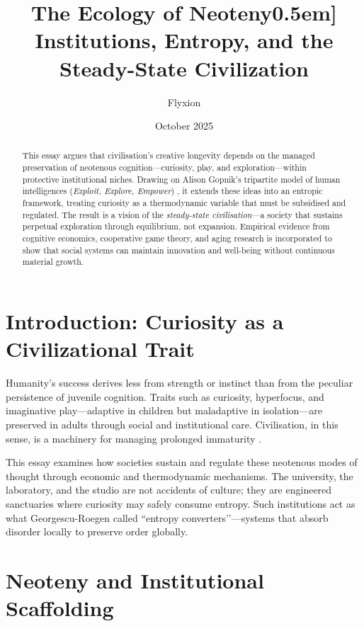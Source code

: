 \documentclass[12pt,a4paper]{article}
\title{\Huge\textbf{The Ecology of Neoteny}\0.5em]
       \Large Institutions, Entropy, and the Steady-State Civilization}
\author{Flyxion}
\date{October 2025}
\begin{document}
\maketitle

\begin{abstract}
This essay argues that civilisation’s creative longevity depends on the managed preservation 
of neotenous cognition---curiosity, play, and exploration---within protective institutional 
niches. Drawing on Alison Gopnik’s tripartite model of human intelligences 
(\emph{Exploit, Explore, Empower}) \citep{gopnik2025evolution,gopnik2016gardener},
it extends these ideas into an entropic framework, 
treating curiosity as a thermodynamic variable that must be subsidised and regulated. 
The result is a vision of the \emph{steady-state civilisation}---a society that sustains 
perpetual exploration through equilibrium, not expansion. 
Empirical evidence from cognitive economics, cooperative game theory, and aging research 
is incorporated to show that social systems can maintain innovation and well-being 
without continuous material growth.
\end{abstract}

\section{Introduction: Curiosity as a Civilizational Trait}

Humanity’s success derives less from strength or instinct than from 
the peculiar persistence of juvenile cognition. 
Traits such as curiosity, hyperfocus, and imaginative play---adaptive in children but 
maladaptive in isolation---are preserved in adults through social and institutional care.
Civilisation, in this sense, is a machinery for managing prolonged immaturity
\citep{gopnik2016gardener}.

This essay examines how societies sustain and regulate 
these neotenous modes of thought through economic and thermodynamic mechanisms. 
The university, the laboratory, and the studio are not accidents of culture; 
they are engineered sanctuaries where curiosity may safely consume entropy.
Such institutions act as 
what Georgescu-Roegen \citep{georgescu1971entropy} called ``entropy converters’’---systems that 
absorb disorder locally to preserve order globally.

\section{Neoteny and Institutional Scaffolding}
\end{document}
